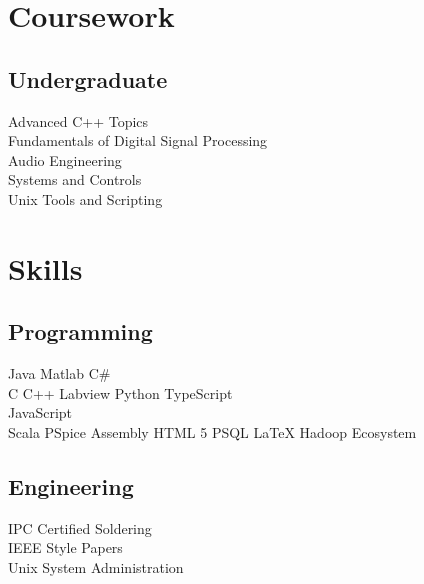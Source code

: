 \documentclass[letterpaper]{deedy-resume-openfont} %
\begin{document}
\begin{minipage}[t]{0.33\textwidth}


\section{Coursework}

\subsection{Undergraduate}

Advanced C++ Topics \\
Fundamentals of Digital Signal Processing \\
Audio Engineering \\
 Systems and Controls\\
Unix Tools and Scripting

\sectionspace %


\section{Skills}

\subsection{Programming}

 Java \textbullet{} Matlab \textbullet{} C\# \\
C \textbullet{} C++ \textbullet{} Labview  \textbullet{} Python \textbullet{} TypeScript \\
\textbullet{} JavaScript\\
Scala \textbullet{} PSpice \textbullet{} Assembly \textbullet{} HTML 5 \textbullet{} PSQL \textbullet{} \LaTeX
\textbullet{} Hadoop Ecosystem

\sectionspace %

\subsection{Engineering}
IPC Certified Soldering \\
IEEE Style Papers \\
Unix System  Administration


\end{minipage}
\end{document}
